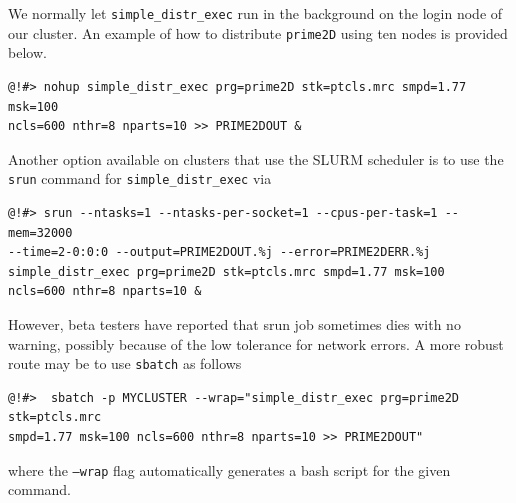\documentclass[a4paper,11pt]{article}
\newcommand{\prgname}[1]{\textcolor{NavyBlue}{\texttt{#1}}}
\begin{document}
We normally let \prgname{simple\_distr\_exec} run in the background on the login node of our cluster. An example of how to distribute \prgname{prime2D} using ten nodes is provided below.
\begin{verbatim}
@!#> nohup simple_distr_exec prg=prime2D stk=ptcls.mrc smpd=1.77 msk=100
ncls=600 nthr=8 nparts=10 >> PRIME2DOUT &
\end{verbatim}
Another option available on clusters that use the SLURM scheduler is to use the \texttt{srun} command for \prgname{simple\_distr\_exec} via
\begin{verbatim}
@!#> srun --ntasks=1 --ntasks-per-socket=1 --cpus-per-task=1 --mem=32000 
--time=2-0:0:0 --output=PRIME2DOUT.%j --error=PRIME2DERR.%j
simple_distr_exec prg=prime2D stk=ptcls.mrc smpd=1.77 msk=100
ncls=600 nthr=8 nparts=10 &
\end{verbatim}
However, beta testers have reported that srun job sometimes dies with no warning, possibly because of the low tolerance for network errors. A more robust route may be to use \texttt{sbatch} as follows
\begin{verbatim}
@!#>  sbatch -p MYCLUSTER --wrap="simple_distr_exec prg=prime2D stk=ptcls.mrc 
smpd=1.77 msk=100 ncls=600 nthr=8 nparts=10 >> PRIME2DOUT"
\end{verbatim}
where the \texttt{--wrap} flag automatically generates a bash script for the given command.
\end{document}
